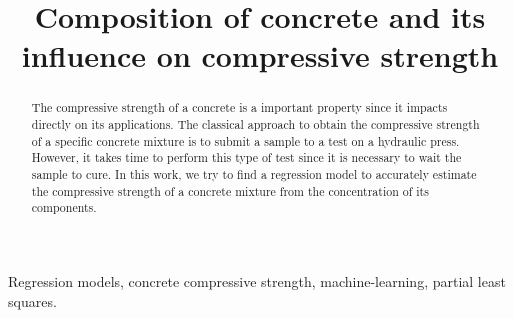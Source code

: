 \documentclass[conference]{IEEEtran}
\begin{document}
\title{Composition of concrete and its influence on compressive strength\\
}

\author{
\and
{}
}

\maketitle

\begin{abstract}
The compressive strength of a concrete is a important property since it impacts directly on its applications. The classical approach to obtain the compressive strength of a specific concrete mixture is to submit a sample to a test on a hydraulic press. However, it takes time to perform this type of test since it is necessary to wait the sample to cure. In this work, we try to find a regression model to accurately estimate the compressive strength of a concrete mixture from the concentration of its components.
\end{abstract}

\begin{IEEEkeywords}
Regression models, concrete compressive strength, machine-learning, partial least squares.
\end{IEEEkeywords}
\end{document}
